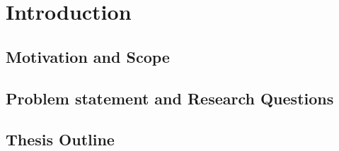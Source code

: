 
\chapter{Introduction}  %

\placeholder{}

\ifpdf
    \graphicspath{{Chapter1/Figs/Raster/}{Chapter1/Figs/PDF/}{Chapter1/Figs/}}
\else
    \graphicspath{{Chapter1/Figs/Vector/}{Chapter1/Figs/}}
\fi


\section{Motivation and Scope} %



\section{Problem statement and Research Questions}  %



\section{Thesis Outline} 

